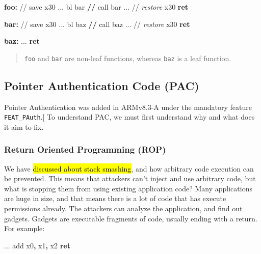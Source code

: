\documentclass[a4paper, nobind]{templates/ociamthesis}
\newenvironment{Shaded}{\begin{snugshade}}{\end{snugshade}}
\newcommand{\BuiltInTok}[1]{#1}
\newcommand{\ControlFlowTok}[1]{\textcolor[rgb]{0.13,0.29,0.53}{\textbf{#1}}}
\newcommand{\FunctionTok}[1]{\textcolor[rgb]{0.13,0.29,0.53}{\textbf{#1}}}
\newcommand{\NormalTok}[1]{#1}
\newcommand{\OperatorTok}[1]{\textcolor[rgb]{0.81,0.36,0.00}{\textbf{#1}}}
\newcommand{\PreprocessorTok}[1]{\textcolor[rgb]{0.56,0.35,0.01}{\textit{#1}}}
\renewenvironment{Shaded}
{
  \vspace{10pt}%
  \begin{snugshade}%
}{%
  \end{snugshade}%
  \vspace{8pt}%
}
\begin{document}
\begin{Shaded}
\begin{Highlighting}[]
\FunctionTok{foo:}
\NormalTok{  // save x30}
\NormalTok{  ...}
\NormalTok{  bl bar  }\OperatorTok{//}\NormalTok{ call bar}
\NormalTok{  ...}
\NormalTok{  // }\PreprocessorTok{restore}\NormalTok{ x30}
  \ControlFlowTok{ret}

\FunctionTok{bar:}
\NormalTok{  // save x30}
\NormalTok{  ...}
\NormalTok{  bl baz  }\OperatorTok{//}\NormalTok{ call baz}
\NormalTok{  ...}
\NormalTok{  // }\PreprocessorTok{restore}\NormalTok{ x30}
  \ControlFlowTok{ret}

\FunctionTok{baz:}
\NormalTok{  ...}
  \ControlFlowTok{ret}
\end{Highlighting}
\end{Shaded}

\begin{quote}
\texttt{foo} and \texttt{bar} are non-leaf functions, whereas \texttt{baz} is a leaf function.
\end{quote}

\subsection{Pointer Authentication Code (PAC)}\label{pac-bg}

Pointer Authentication was added in ARMv8.3-A under the mandatory feature \texttt{FEAT\_PAuth}.{[}\citeproc{ref-arm-feat-names}{9}{]}
To understand PAC, we must first understand why and what does it aim to fix.

\subsubsection{Return Oriented Programming (ROP)}\label{return-oriented-programming-rop}

We have \hl{discussed about stack smashing}, and how arbitrary code execution can be prevented.
This means that attackers can't inject and use arbitrary code, but what is stopping
them from using existing application code? Many applications are huge in size,
and that means there is a lot of code that has execute permissions already.
The attackers can analyze the application, and find out gadgets. Gadgets are executable
fragments of code, usually ending with a return. For example:

\begin{Shaded}
\begin{Highlighting}[]
\NormalTok{...}
\BuiltInTok{add}\NormalTok{ x0}\OperatorTok{,}\NormalTok{ x1}\OperatorTok{,}\NormalTok{ x2}
\ControlFlowTok{ret}
\end{Highlighting}
\end{Shaded}
\end{document}
